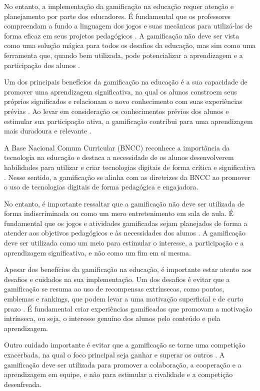 No entanto, a implementação da gamificação na educação requer atenção e planejamento por parte dos educadores. É fundamental que os professores compreendam a fundo a linguagem dos jogos e suas mecânicas para utilizá-las de forma eficaz em seus projetos pedagógicos \cite{fardo2013gamificaccao}. A gamificação não deve ser vista como uma solução mágica para todos os desafios da educação, mas sim como uma ferramenta que, quando bem utilizada, pode potencializar a aprendizagem e a participação dos alunos \cite{fardo2013gamificaccao}.

Um dos principais benefícios da gamificação na educação é a sua capacidade de promover uma aprendizagem significativa, na qual os alunos constroem seus próprios significados e relacionam o novo conhecimento com suas experiências prévias \cite{lemos2011aprendizagem}. Ao levar em consideração os conhecimentos prévios dos alunos e estimular sua participação ativa, a gamificação contribui para uma aprendizagem mais duradoura e relevante \cite{pelizzari2002teoria}.

A Base Nacional Comum Curricular (BNCC) reconhece a importância da tecnologia na educação e destaca a necessidade de os alunos desenvolverem habilidades para utilizar e criar tecnologias digitais de forma crítica e significativa \cite{brasil2018base}. Nesse sentido, a gamificação se alinha com as diretrizes da BNCC ao promover o uso de tecnologias digitais de forma pedagógica e engajadora.

No entanto, é importante ressaltar que a gamificação não deve ser utilizada de forma indiscriminada ou como um mero entretenimento em sala de aula. É fundamental que os jogos e atividades gamificadas sejam planejados de forma a atender aos objetivos pedagógicos e às necessidades dos alunos \cite{lopes2022uso}. A gamificação deve ser utilizada como um meio para estimular o interesse, a participação e a aprendizagem significativa, e não como um fim em si mesma.

Apesar dos benefícios da gamificação na educação, é importante estar atento aos desafios e cuidados na sua implementação. Um dos desafios é evitar que a gamificação se resuma ao uso de recompensas extrínsecas, como pontos, emblemas e rankings, que podem levar a uma motivação superficial e de curto prazo \cite{silva2017recurso}. É fundamental criar experiências gamificadas que promovam a motivação intrínseca, ou seja, o interesse genuíno dos alunos pelo conteúdo e pela aprendizagem.

Outro cuidado importante é evitar que a gamificação se torne uma competição exacerbada, na qual o foco principal seja ganhar e superar os outros \cite{silva2017recurso}. A gamificação deve ser utilizada para promover a colaboração, a cooperação e a aprendizagem em equipe, e não para estimular a rivalidade e a competição desenfreada.

